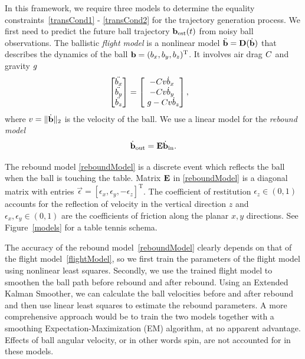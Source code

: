 In this framework, we require three models to determine the equality constraints~\eqref{transCond1} - \eqref{transCond2} for the trajectory generation process. We first need to predict the future ball trajectory $\boldsymbol{\mathrm{b}}_{\mathrm{est}}(t)$ from noisy ball observations.  The ballistic \emph{flight model} is a nonlinear model $\ddot{\boldsymbol{\mathrm{b}}} = \boldsymbol{\mathrm{D}}(\dot{\boldsymbol{\mathrm{b}}})$ that describes the dynamics of the ball $\boldsymbol{\mathrm{b}} = (b_x,b_y,b_z)^{\mathrm{T}}$. It involves air drag $C$ and gravity $g$
%
\begin{align}
\begin{bmatrix}
   \ddot{b_x} \\
   \ddot{b_y} \\
   \ddot{b_z}   
 \end{bmatrix} &= 
 \begin{bmatrix}
 -C v \dot{b}_x  \\
 -C v \dot{b}_y  \\
 \ g - C v \dot{b}_z 
 \end{bmatrix},
\label{flightModel}
\end{align}
%
\noindent where $v = \|\dot{\boldsymbol{\mathrm{b}}}\|_2$ is the velocity of the ball. We use a linear model for the \emph{rebound model}
%
\begin{align}
\dot{\boldsymbol{\mathrm{b}}}_{\mathrm{out}} = \boldsymbol{\mathrm{E}}\dot{\boldsymbol{\mathrm{b}}}_{\mathrm{in}}.
\label{reboundModel}
\end{align}

\noindent The rebound model \eqref{reboundModel} is a discrete event which reflects the ball when the ball is touching the table. Matrix $\boldsymbol{\mathrm{E}}$ in \eqref{reboundModel} is a diagonal matrix with entries $\vec{\epsilon} = [\epsilon_{x}, \epsilon_{y}, -\epsilon_{z}]^{\mathrm{T}}$. The coefficient of restitution $\epsilon_{z} \in (0,1)$ accounts for the reflection of velocity in the vertical direction $z$ and $\epsilon_{x}, \epsilon_{y} \in (0,1)$ are the coefficients of friction along the planar $x,y$ directions. See Figure~\ref{models} for a table tennis schema. 

The accuracy of the rebound model~\eqref{reboundModel} clearly depends on that of the flight model~\eqref{flightModel}, so we first train the parameters of the flight model using nonlinear least squares. Secondly, we use the trained flight model to smoothen the ball path before rebound and after rebound. Using an Extended Kalman Smoother, we can calculate the ball velocities before and after rebound and then use linear least squares to estimate the rebound parameters. A more comprehensive approach would be to train the two models together with a smoothing Expectation-Maximization (EM) algorithm, at no apparent advantage. %
Effects of ball angular velocity, or in other words spin, are not accounted for in these models.


